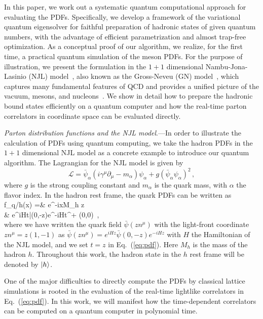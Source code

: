 \documentclass[aps,prl,twocolumn,superscriptaddress,notitlepage,nofootinbib]{revtex4-1}
\def\bea#1\eea{\begin{align}#1\end{align}}
\newcommand{\nn}{\nonumber\\}
\begin{document}
In this paper, we work out a systematic quantum computational approach for evaluating the PDFs. Specifically, we develop a framework of the variational quantum eigensolver for faithful preparation of hadronic states of given quantum numbers, with the advantage of efficient parametrization and almost trap-free optimization. As a conceptual proof of our algorithm, we realize, for the first time, a practical quantum simulation of the meson PDFs. For the purpose of illustration, we present the formulation in the $1+1$ dimensional Nambu-Jona-Lasinio (NJL) model~\cite{Nambu:1961tp,Nambu:1961fr}, also known as the Gross-Neveu (GN) model~\cite{Gross:1974jv}, which captures many fundamental features of QCD and provides a unified picture of the vacuum, mesons, and nucleons~\cite{Christov:1995vm}. We show in detail how to prepare the hadronic bound states efficiently on a quantum computer and how the real-time parton correlators in coordinate space can be evaluated directly. 


\textit{Parton distribution functions and the NJL model}.---In order to illustrate the calculation of PDFs using quantum computing, we take the hadron PDFs in the $1+1$ dimensional NJL model as a concrete example to introduce our quantum algorithm. The Lagrangian for the NJL model is given by
\begin{equation}\label{LA}
	\mathcal{L}=\bar{\psi}_\alpha (i\gamma^\mu \partial_\mu-m_\alpha)\psi_\alpha +g(\bar{\psi}_\alpha \psi_\alpha)^2\,,
\end{equation}
where $g$ is the strong coupling constant and $m_\alpha$ is the quark mass, with $\alpha$ the flavor index. In the hadron rest frame, the quark PDFs can be written as
\bea\label{eq:pdf}
	f_{q/h}(x) =&\int {} e^{-ixM_h  z}
	\nn 
&\times {} e^{iHt}\bar{\psi}(0,-z)e^{-iHt}\gamma^+ \psi(0,0) \,, \nn 
\eea 
where we have written the quark field ${\bar \psi}(zn^\mu)$ with the light-front coordinate $zn^\mu = z(1,-1)$ as ${\bar \psi}(zn^\mu) = e^{iHz}\bar{\psi}(0,-z) e^{-iHz}$ with $H$ the Hamiltonian of the NJL model, and we set $t = z$ in Eq.~(\ref{eq:pdf}).
Here $M_h$ is the mass of the hadron $h$. Throughout this work, the hadron state in the $h$ rest frame will be denoted by $\ket{h}$.

One of the major difficulties to directly compute the PDFs by classical lattice simulations is rooted in the evaluation of the real-time lightlike correlators in Eq.~({\ref{eq:pdf}}). In this work, we will manifest how the time-dependent correlators can be computed on a quantum computer in polynomial time.
\end{document}
